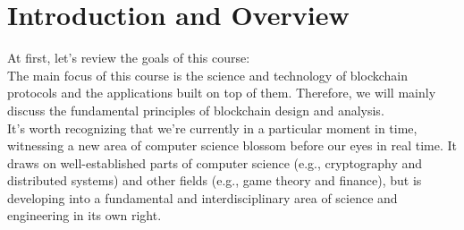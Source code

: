 \chapter{Introduction and Overview}

At first, let's review the goals of this course:\\
The main focus of this course is the science and technology of blockchain protocols and the applications built on top of them. Therefore, we will mainly discuss the fundamental principles of blockchain design and analysis.\\
 It’s worth recognizing that we’re currently in a particular moment
in time, witnessing a new area of computer science blossom before our eyes in real time. It draws on well-established parts of computer science (e.g., cryptography and distributed systems) and other fields (e.g., game theory and finance), but is developing into a fundamental and interdisciplinary area of science and engineering in its own right.

